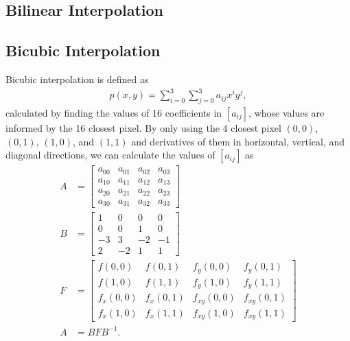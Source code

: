 \documentclass[conference]{IEEEtran}
\begin{document}
\subsection{Bilinear Interpolation}


\subsection{Bicubic Interpolation}
Bicubic interpolation is defined as 
\begin{align}
	p(x, y) = \sum_{i = 0}^3\sum_{j = 0}^3a_{ij}x^iy^j,\label{BicubicDef}
\end{align}
calculated by finding the values of 16 coefficients in $[a_{ij}]$, whose values are informed by the 16 closest pixel. By only using the 4 closest pixel $(0,0)$, $(0,1)$, $(1,0)$, and $(1,1)$ and derivatives of them in horizontal, vertical, and diagonal directions, we can calculate the values of $[a_{ij}]$ as 
\begin{align}
	A &=
	\begin{bmatrix}
		a_{00} & a_{01} & a_{02} & a_{03}\\
		a_{10} & a_{11} & a_{12} & a_{13}\\
		a_{20} & a_{21} & a_{22} & a_{23}\\
		a_{30} & a_{31} & a_{32} & a_{33}
	\end{bmatrix}\\
	B &=
	\begin{bmatrix}
		1 & 0 & 0 & 0\\
		0 & 0 & 1 & 0\\
		-3 & 3 & -2 & -1\\
		2 & -2 & 1 & 1
	\end{bmatrix}\\
	F &=
	\begin{bmatrix}
		f(0,0) & f(0,1) & f_y(0,0) & f_y(0,1)\\
		f(1,0) & f(1,1) & f_y(1,0) & f_y(1,1)\\
		f_x(0,0) & f_x(0,1) & f_{xy}(0,0) & f_{xy}(0,1)\\
		f_x(1,0) & f_x(1,1) & f_{xy}(1,0) & f_{xy}(1,1)
	\end{bmatrix}\\
	A &= BFB^{-1}.\label{BicubicVal}
\end{align}
\end{document}
